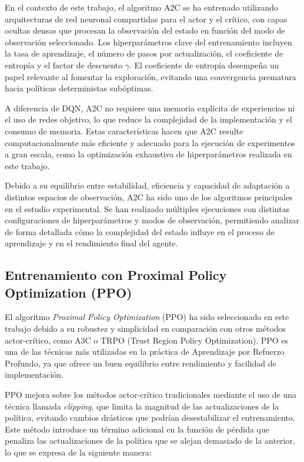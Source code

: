 En el contexto de este trabajo, el algoritmo A2C se ha entrenado utilizando arquitecturas de red neuronal compartidas para el actor y el crítico, con capas ocultas densas que procesan la observación del estado en función del modo de observación seleccionado. Los hiperparámetros clave del entrenamiento incluyen la tasa de aprendizaje, el número de pasos por actualización, el coeficiente de entropía y el factor de descuento $\gamma$. El coeficiente de entropía desempeña un papel relevante al fomentar la exploración, evitando una convergencia prematura hacia políticas deterministas subóptimas.

A diferencia de DQN, A2C no requiere una memoria explícita de experiencias ni el uso de redes objetivo, lo que reduce la complejidad de la implementación y el consumo de memoria. Estas características hacen que A2C resulte computacionalmente más eficiente y adecuado para la ejecución de experimentos a gran escala, como la optimización exhaustiva de hiperparámetros realizada en este trabajo.

Debido a su equilibrio entre estabilidad, eficiencia y capacidad de adaptación a distintos espacios de observación, A2C ha sido uno de los algoritmos principales en el estudio experimental. Se han realizado múltiples ejecuciones con distintas configuraciones de hiperparámetros y modos de observación, permitiendo analizar de forma detallada cómo la complejidad del estado influye en el proceso de aprendizaje y en el rendimiento final del agente.

\subsection{Entrenamiento con Proximal Policy Optimization (PPO)}

El algoritmo \textit{Proximal Policy Optimization} (PPO) ha sido seleccionado en este trabajo debido a su robustez y simplicidad en comparación con otros métodos actor-crítico, como A3C o TRPO (Trust Region Policy Optimization). PPO es una de las técnicas más utilizadas en la práctica de Aprendizaje por Refuerzo Profundo, ya que ofrece un buen equilibrio entre rendimiento y facilidad de implementación.

PPO mejora sobre los métodos actor-crítico tradicionales mediante el uso de una técnica llamada \textit{clipping}, que limita la magnitud de las actualizaciones de la política, evitando cambios drásticos que podrían desestabilizar el entrenamiento. Este método introduce un término adicional en la función de pérdida que penaliza las actualizaciones de la política que se alejan demasiado de la anterior, lo que se expresa de la siguiente manera:

